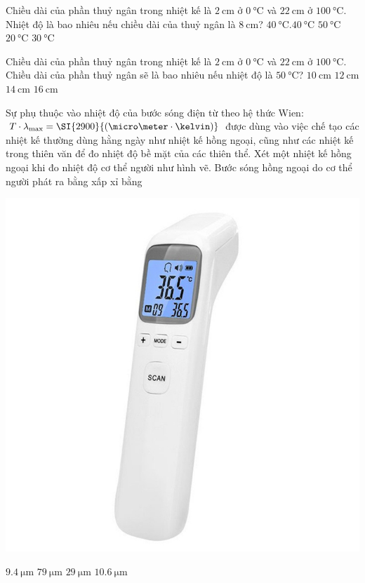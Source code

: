 \begin{ex}
Chiều dài của phần thuỷ ngân trong nhiệt kế là $\SI{2}{\centi\meter}$ ở $\SI{0}{\celsius}$ và $\SI{22}{\centi\meter}$ ở $\SI{100}{\celsius}$. Nhiệt độ là bao nhiêu nếu chiều dài của thuỷ ngân là $\SI{8}{\centi\meter}$?
	\choice
	{$\SI{40}{\celsius}$.$\SI{40}{\celsius}$}
	{$\SI{50}{\celsius}$}
	{$\SI{20}{\celsius}$}
	{\True $\SI{30}{\celsius}$}
\end{ex}
\begin{ex}
Chiều dài của phần thuỷ ngân trong nhiệt kế là $\SI{2}{\centi\meter}$ ở $\SI{0}{\celsius}$ và $\SI{22}{\centi\meter}$ ở $\SI{100}{\celsius}$. Chiều dài của phần thuỷ ngân sẽ là bao nhiêu nếu nhiệt độ là $\SI{50}{\celsius}$?
	\choice
	{$\SI{10}{\centi\meter}$}
	{\True $\SI{12}{\centi\meter}$}
	{$\SI{14}{\centi\meter}$}
	{$\SI{16}{\centi\meter}$}
\end{ex}
\begin{ex}
Sự phụ thuộc vào nhiệt độ của bước sóng điện từ theo hệ thức Wien: $T\cdot\lambda_\text{max}=\SI{2900}{\left(\micro\meter\cdot\kelvin\right)}$ được dùng vào việc chế tạo các nhiệt kế thường dùng hằng ngày như
nhiệt kế hồng ngoại, cũng như các nhiệt kế trong thiên văn để đo nhiệt độ bề mặt của
các thiên thể. Xét một nhiệt kế hồng ngoại khi đo nhiệt độ cơ thể người như hình vẽ.
Bước sóng hồng ngoại do cơ thể người phát ra bằng xấp xỉ bằng
\begin{center}
	\includegraphics[width=0.3\linewidth]{figs/VN12-Y24-PH-SYL-002P-1}
\end{center}
	\choice
	{\True $\SI{9.4}{\micro\meter}$}
	{$\SI{79}{\micro\meter}$}
	{$\SI{29}{\micro\meter}$}
	{$\SI{10.6}{\micro\meter}$}
\end{ex}
